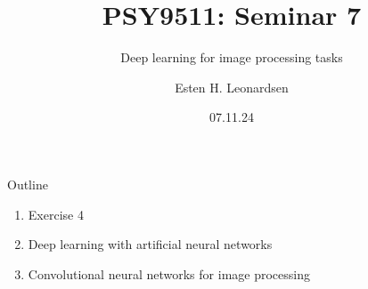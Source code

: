 \documentclass[10pt]{beamer}
\title{PSY9511: Seminar 7}
\subtitle{Deep learning for image processing tasks}
\author{Esten H. Leonardsen}
\date{07.11.24}
\begin{document}
	\begin{frame}
	 	\maketitle
	\end{frame}

    \begin{frame}{Outline}
        \begin{enumerate}
            \item Exercise 4
            \item Deep learning with artificial neural networks
            \item Convolutional neural networks for image processing
        \end{enumerate}
    \end{frame}

    \def\nodesize{14pt}


    \newcommand{\highlightedneuron}[4]{
        \node[
            circle,
            draw=#4,
            fill=nodefill,
            minimum size=\nodesize,
            inner sep=0pt
        ] (#2) at #1 {};
    }

    \newcommand{\artificialneuron}[3]{
        \highlightedneuron{#1}{#2}{#3}{black}
    }

    \def\spacing{-0.1cm}

    
    
    
\end{document}
